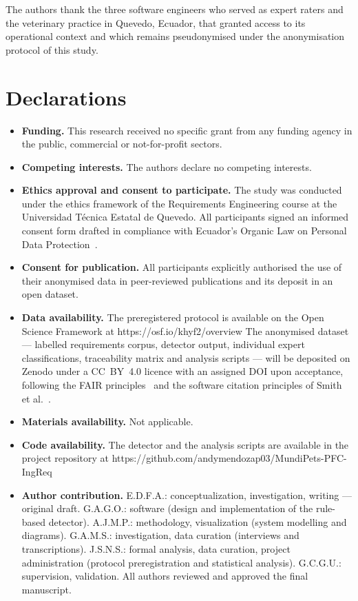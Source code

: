 \documentclass[pdflatex,sn-mathphys-num]{sn-jnl}
\theoremstyle{thmstyleone}%
\theoremstyle{thmstyletwo}%
\theoremstyle{thmstylethree}%
\begin{document}
\backmatter


The authors thank the three software engineers who served as expert raters and
the veterinary practice in Quevedo, Ecuador, that granted access to its
operational context and which remains pseudonymised under the anonymisation
protocol of this study.

\section*{Declarations}

\begin{itemize}
\item \textbf{Funding.} This research received no specific grant from any
funding agency in the public, commercial or not-for-profit sectors.
\item \textbf{Competing interests.} The authors declare no competing interests.
\item \textbf{Ethics approval and consent to participate.} The study was
conducted under the ethics framework of the Requirements Engineering course at
the Universidad Técnica Estatal de Quevedo. All participants signed an informed
consent form drafted in compliance with Ecuador's Organic Law on Personal Data
Protection~\cite{lopdp2021}.
\item \textbf{Consent for publication.} All participants explicitly authorised
the use of their anonymised data in peer-reviewed publications and its deposit
in an open dataset.
\item \textbf{Data availability.} The preregistered protocol is available on the
Open Science Framework at https://osf.io/khyf2/overview The anonymised dataset --- labelled requirements corpus, detector output,
individual expert classifications, traceability matrix and analysis scripts ---
will be deposited on Zenodo under a CC~BY~4.0 licence with an assigned DOI upon
acceptance, following the FAIR principles~\cite{wilkinson2016} and the
software citation principles of Smith et al.~\cite{smith2016}.
\item \textbf{Materials availability.} Not applicable.
\item \textbf{Code availability.} The detector and the analysis scripts are
available in the project repository at
https://github.com/andymendozap03/MundiPets-PFC-IngReq
\item \textbf{Author contribution.} E.D.F.A.: conceptualization,
investigation, writing --- original draft. G.A.G.O.: software (design and
implementation of the rule-based detector). A.J.M.P.: methodology,
visualization (system modelling and diagrams). G.A.M.S.: investigation, data
curation (interviews and transcriptions). J.S.N.S.: formal analysis, data
curation, project administration (protocol preregistration and statistical
analysis). G.C.G.U.: supervision, validation. All authors reviewed and approved
the final manuscript.
\end{itemize}


\end{document}

